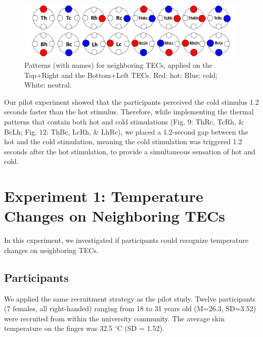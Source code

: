 \documentclass[preprint,12pt]{elsarticle}
\begin{document}

\begin{figure}[tp]
  \centering
  \includegraphics[width=0.9\columnwidth]{img/fig9.pdf}
  \caption{Patterns (with names) for neighboring TECs, applied on the Top+Right and the Bottom+Left TECs. Red: hot; Blue: cold; White: neutral.}
  \label{fig:9}
\end{figure}

Our pilot experiment showed that the participants perceived the cold stimulus 1.2 seconds faster than the hot stimulus. Therefore, while implementing the thermal patterns that contain both hot and cold stimulations (Fig. 9: ThRc, TcRh, \& BcLh; Fig. 12: ThBc, LcRh, \& LhRc), we placed a 1.2-second gap between the hot and the cold stimulation, meaning the cold stimulation was triggered 1.2 seconds after the hot stimulation, to provide a simultaneous sensation of hot and cold.

\section{Experiment 1: Temperature Changes on Neighboring TECs}
In this experiment, we investigated if participants could recognize temperature changes on neighboring TECs.

\subsection{Participants}
We applied the same recruitment strategy as the pilot study. Twelve participants (7 females, all right-handed) ranging from 18 to 31 years old (M=26.3, SD=3.52) were recruited from within the university community. The average skin temperature on the finger was 32.5 $^{\circ}$C (SD = 1.52).
\end{document}
